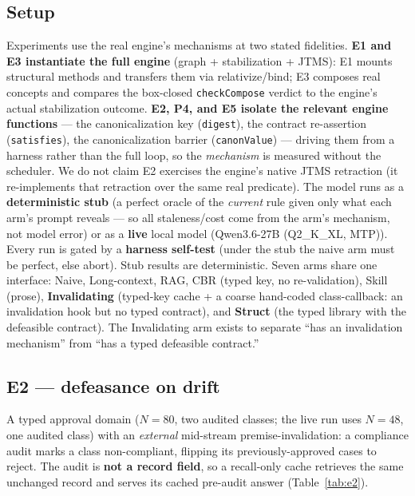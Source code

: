 \documentclass[11pt]{article}
\begin{document}
\subsection{Setup}
Experiments use the real engine's mechanisms at two stated fidelities. \textbf{E1 and E3 instantiate the full
engine} (graph + stabilization + JTMS): E1 mounts structural methods and transfers them via relativize/bind; E3
composes real concepts and compares the box-closed \texttt{checkCompose} verdict to the engine's actual
stabilization outcome. \textbf{E2, P4, and E5 isolate the relevant engine functions} --- the canonicalization key
(\texttt{digest}), the contract re-assertion (\texttt{satisfies}), the canonicalization barrier
(\texttt{canonValue}) --- driving them from a harness rather than the full loop, so the \emph{mechanism} is measured
without the scheduler. We do not claim E2 exercises the engine's native JTMS retraction (it re-implements that
retraction over the same real predicate). The model runs as a \textbf{deterministic stub} (a perfect oracle of the
\emph{current} rule given only what each arm's prompt reveals --- so all staleness/cost come from the arm's
mechanism, not model error) or as a \textbf{live} local model (Qwen3.6-27B (Q2\_K\_XL, MTP)). Every run is gated by a
\textbf{harness self-test} (under the stub the naive arm must be perfect, else abort). Stub results are deterministic. Seven arms share one interface: Naive,
Long-context, RAG, CBR (typed key, no re-validation), Skill (prose), \textbf{Invalidating} (typed-key cache + a
coarse hand-coded class-callback: an invalidation hook but no typed contract), and \textbf{Struct} (the typed
library with the defeasible contract). The Invalidating arm exists to separate ``has an invalidation mechanism''
from ``has a typed defeasible contract.''

\subsection{E2 --- defeasance on drift}
A typed approval domain ($N{=}80$, two audited classes; the live run uses $N{=}48$, one audited class) with an
\emph{external} mid-stream premise-invalidation: a compliance audit marks a class non-compliant, flipping its
previously-approved cases to reject. The audit is \textbf{not a record field}, so a recall-only cache retrieves the
same unchanged record and serves its cached pre-audit answer (Table~\ref{tab:e2}).
\end{document}
